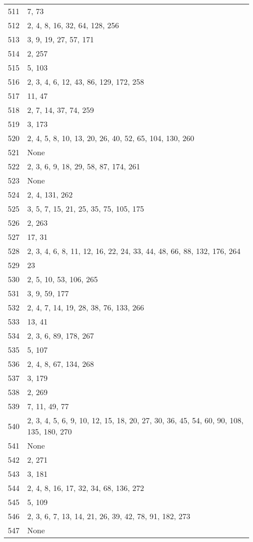 \documentclass[12pt]{article}
\begin{document}
\begin{tabular}{|r|l|}
511 & 7, 73 \\ 
512 & 2, 4, 8, 16, 32, 64, 128, 256 \\ 
513 & 3, 9, 19, 27, 57, 171 \\ 
514 & 2, 257 \\ 
515 & 5,  103 \\ 
516 & 2, 3, 4, 6, 12, 43,  86, 129, 172, 258 \\ 
517 & 11, 47 \\ 
518 & 2, 7, 14, 37, 74, 259 \\ 
519 & 3, 173 \\ 
520 & 2, 4, 5, 8, 10, 13, 20, 26, 40, 52, 65, 104, 130, 260 \\ 
521 & None \\ 
522 & 2, 3, 6, 9, 18, 29, 58, 87, 174, 261 \\ 
523 & None \\ 
524 & 2, 4, 131, 262 \\ 
525 & 3, 5, 7, 15, 21, 25, 35, 75, 105, 175 \\ 
526 & 2, 263 \\ 
527 & 17, 31 \\ 
528 & 2, 3, 4, 6, 8, 11, 12, 16, 22, 24, 33, 44, 48, 66, 88, 132,  176, 264 \\ 
529 & 23 \\ 
530 & 2, 5, 10, 53, 106, 265 \\ 
531 & 3, 9, 59, 177 \\ 
532 & 2, 4, 7, 14, 19, 28, 38, 76, 133, 266 \\ 
533 & 13, 41 \\ 
534 & 2, 3, 6, 89, 178, 267 \\ 
535 & 5, 107 \\ 
536 & 2, 4, 8, 67, 134, 268 \\ 
537 & 3, 179 \\ 
538 & 2, 269 \\ 
539 & 7, 11,  49, 77 \\ 
540 & 2, 3, 4, 5, 6, 9, 10, 12, 15, 18, 20, 27, 30, 36, 45, 54, 60, 90, 108, 135, 180, 270 \\ 
541 & None \\ 
542 & 2, 271 \\ 
543 & 3, 181 \\ 
544 & 2, 4, 8, 16, 17, 32, 34, 68,  136, 272 \\ 
545 & 5, 109 \\ 
546 & 2, 3, 6, 7, 13, 14,  21, 26, 39, 42, 78, 91, 182, 273 \\ 
547 & None \\ 

\end{tabular}
\end{document}
